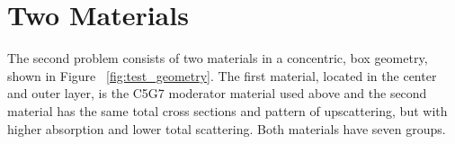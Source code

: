 \section{Two Materials}
The second problem consists of two materials in a concentric, box geometry, shown in Figure ~\ref{fig:test_geometry}. 
The first material, located in the center and outer layer, is the C5G7 moderator material used above and the second material has the same total cross sections and pattern of upscattering, but with higher absorption and lower total scattering. Both materials have seven groups. 
\DIFdelbegin %

{%
}
